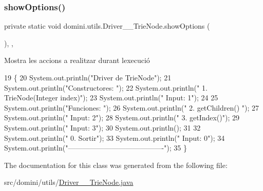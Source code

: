 \mbox{\label{classdomini_1_1utils_1_1Driver____TrieNode_ab9e971ebb4f8e219efaab32c6654243a}} 
\subsubsection{\texorpdfstring{show\+Options()}{showOptions()}}
{\footnotesize\ttfamily private static void domini.\+utils.\+Driver\+\_\+\+\_\+\+Trie\+Node.\+show\+Options (\begin{DoxyParamCaption}{ }\end{DoxyParamCaption})\hspace{0.3cm}{\ttfamily [inline]}, {\ttfamily [static]}, {\ttfamily [private]}}



Mostra les accions a realitzar durant l\textquotesingle{}execució 


\begin{DoxyCode}
19                                      \{
20         System.out.println(\textcolor{stringliteral}{"Driver de TrieNode"});
21         System.out.println(\textcolor{stringliteral}{"Constructores: "});
22         System.out.println(\textcolor{stringliteral}{"     1. TrieNode(Integer index)"});
23         System.out.println(\textcolor{stringliteral}{"     Input: 1"});
24 
25         System.out.println(\textcolor{stringliteral}{"Funciones: "});
26         System.out.println(\textcolor{stringliteral}{"     2. getChildren() "});
27         System.out.println(\textcolor{stringliteral}{"     Input: 2"});
28         System.out.println(\textcolor{stringliteral}{"     3. getIndex()"});
29         System.out.println(\textcolor{stringliteral}{"     Input: 3"});
30         System.out.println();
31 
32         System.out.println(\textcolor{stringliteral}{"     0. Sortir"});
33         System.out.println(\textcolor{stringliteral}{"     Input: 0"});
34         System.out.println(\textcolor{stringliteral}{"----------------------------------------"});
35     \}
\end{DoxyCode}


The documentation for this class was generated from the following file\+:\begin{DoxyCompactItemize}
\item 
src/domini/utils/\hyperlink{Driver____TrieNode_8java}{Driver\+\_\+\+\_\+\+Trie\+Node.\+java}\end{DoxyCompactItemize}
